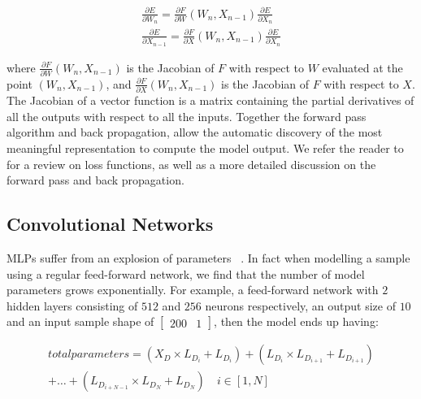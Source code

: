 \begin{subequations}
\begin{gather}
	\frac{\partial E} {\partial W_n} = \frac{\partial F} {\partial W}(W_n, X_{n-1})\frac{\partial E} {\partial X_n} \\
	\frac{\partial E} {\partial X_{n-1}} = \frac{\partial F} {\partial X}(W_n, X_{n-1})\frac{\partial E} {\partial X_n} 
\end{gather}
\end{subequations}

where $\frac{\partial F} {\partial W}(W_n, X_{n-1})$ is the Jacobian of $F$ with respect to $W$ evaluated at the point $(W_n, X_{n-1})$, and  $\frac{\partial F} {\partial X}(W_n, X_{n-1})$ is the Jacobian of $F$ with respect to $X$. The Jacobian of a vector function is a matrix containing the partial derivatives of all the outputs with respect to all the inputs. Together the forward pass algorithm and back propagation, allow the automatic discovery of the most meaningful representation to compute the model output. We refer the reader to ~\citep{Goodfellow-et-al-2016} for a review on loss functions, as well as a more detailed discussion on the forward pass and back propagation. 


\subsection{Convolutional Networks}

MLPs suffer from an explosion of parameters  ~\citep{krizhevsky2012imagenet}. In fact when modelling a sample using a regular feed-forward network, we find that the number of model parameters grows exponentially. For example, a feed-forward network with $2$ hidden layers consisting of $512$ and $256$ neurons respectively, an output size of $10$ and an input sample shape of $\left [ \begin{matrix} 200 & 1 \end{matrix} \right] $, then the model ends up having: 


\begin{multline}
		total parameters = (X_D \times L_{D_i} + L_{D_i}) + (L_{D_i} \times L_{D_{i+1}} + L_{D_{i+1}}) \\ 
		+ \dots + (L_{D_{i+N-1}} \times L_{D_{N}} + L_{D_{N}}) \quad i \in [1, N]
\end{multline}

